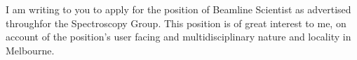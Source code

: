 \documentclass[10pt,a4paper,ragged2e,withhyper,paragraphstrue]{altacv}
\newcommand{\pind}{\hspace{24pt}}
\begin{document}



	\pind I am writing to you to apply for the position of Beamline Scientist as advertised throughfor the Spectroscopy Group. This position is of great interest to me, on account of the position's user facing and multidisciplinary nature and locality in Melbourne. 
\end{document}
